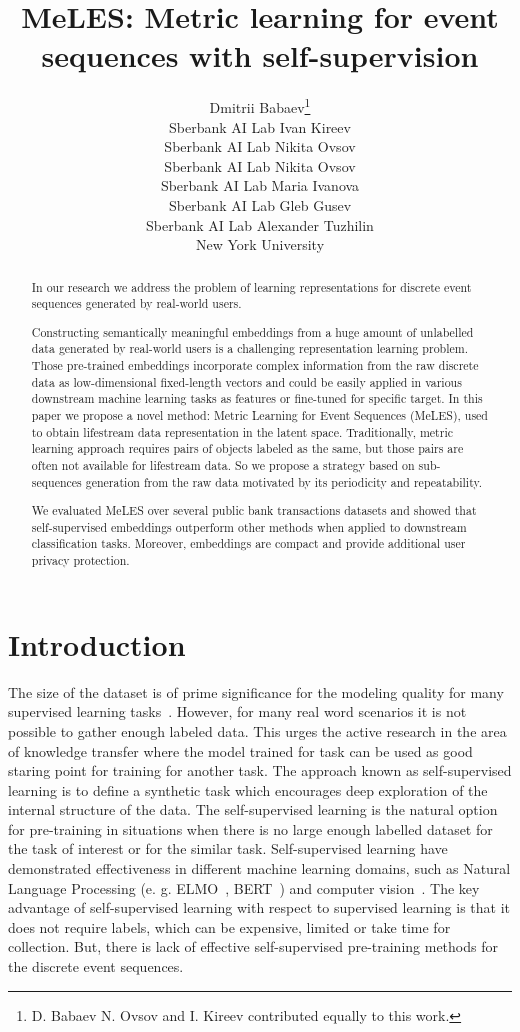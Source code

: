 \documentclass{article}
\title{MeLES: Metric learning for event sequences with self-supervision}
\author{
Dmitrii Babaev\thanks{D. Babaev N. Ovsov and I. Kireev contributed equally to this work.} \\
Sberbank AI Lab
\And
Ivan Kireev \\
Sberbank AI Lab
\And
Nikita Ovsov \\
Sberbank AI Lab
\And
Nikita Ovsov \\
Sberbank AI Lab
\And
Maria Ivanova \\
Sberbank AI Lab
\And
Gleb Gusev \\
Sberbank AI Lab
\And
Alexander Tuzhilin \\
New York University
}
\begin{document}
\maketitle

\begin{abstract}

In our research we address the problem of learning representations for discrete event sequences generated by real-world users.

Constructing semantically meaningful embeddings from a huge amount of unlabelled data generated by real-world users is a challenging representation learning problem. Those pre-trained embeddings incorporate complex information from the raw discrete data as low-dimensional fixed-length vectors and could be easily applied in various downstream machine learning tasks as features or fine-tuned for specific target. In this paper we propose a novel method: Metric Learning for Event Sequences (MeLES), used to obtain lifestream data representation in the latent space. Traditionally, metric learning approach requires pairs of objects labeled as the same, but those pairs are often not available for lifestream data. So we propose a strategy based on sub-sequences generation from the raw data motivated by its periodicity and repeatability.

We evaluated MeLES over several public bank transactions datasets and showed that self-supervised embeddings outperform other methods when applied to downstream classification tasks. Moreover, embeddings are compact and provide additional user privacy protection.

\end{abstract}

\section{Introduction} \label{sec-intro}

The size of the dataset is of prime significance for the modeling quality for many supervised learning tasks~\cite{Sun2017RevisitingUE}. However, for many real word scenarios it is not possible to gather enough labeled data. This urges the active research in the area of knowledge transfer where the model trained for task can be used as good staring point for training for another task. The approach known as self-supervised learning is to define a synthetic task which encourages deep exploration of the internal structure of the data. The self-supervised learning is the natural option for pre-training in situations when there is no large enough labelled dataset for the task of interest or for the similar task. Self-supervised learning have demonstrated effectiveness in different machine learning domains, such as Natural Language Processing (e. g. ELMO~\cite{Peters2018DeepCW}, BERT~\cite{Devlin2019BERTPO}) and computer vision~\cite{Doersch2015UnsupervisedVR}. The key advantage of self-supervised learning with respect to supervised learning is that it does not require labels, which can be expensive, limited or take time for collection. But, there is lack of effective self-supervised pre-training methods for the discrete event sequences.
\end{document}
